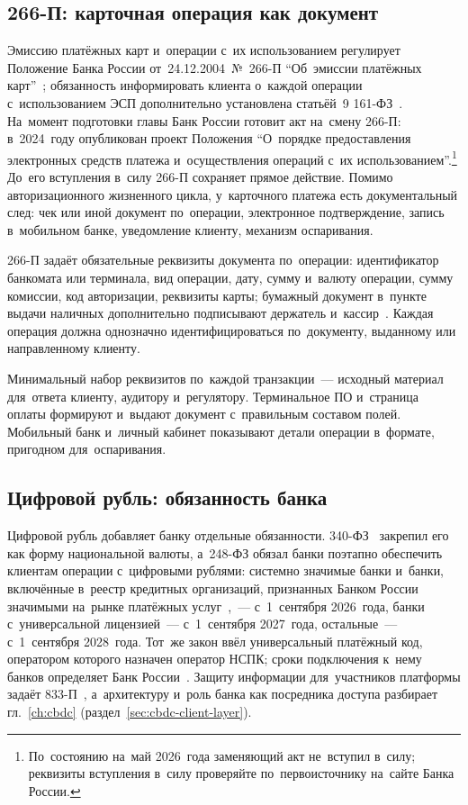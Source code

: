 \subsection*{266-П: карточная операция как документ}

Эмиссию платёжных карт и~операции с~их использованием регулирует Положение
Банка России от~24.12.2004~№~266-П \enquote{Об~эмиссии платёжных
карт}~\cite{cbr-266p}; обязанность информировать клиента о~каждой операции
с~использованием ЭСП дополнительно установлена статьёй~9 161-ФЗ~\cite{fz-161}.
На~момент подготовки главы Банк России готовит акт на~смену 266-П: в~2024~году
опубликован проект Положения \enquote{О~порядке предоставления электронных
  средств платежа и~осуществления операций с~их
использованием}.\footnote{По~состоянию на~май 2026~года заменяющий акт
  не~вступил в~силу; реквизиты вступления в~силу проверяйте по~первоисточнику
на~сайте Банка России.} До~его вступления в~силу 266-П сохраняет прямое
действие. Помимо авторизационного жизненного цикла, у~карточного платежа есть
документальный след: чек или иной документ по~операции,
электронное подтверждение, запись в~мобильном банке, уведомление клиенту,
механизм оспаривания.

266-П задаёт обязательные реквизиты документа по~операции: идентификатор
банкомата или терминала, вид операции, дату, сумму и~валюту операции, сумму
комиссии, код авторизации, реквизиты карты; бумажный документ в~пункте выдачи
наличных дополнительно подписывают держатель и~кассир~\cite{cbr-266p}. Каждая операция должна
однозначно идентифицироваться по~документу, выданному или направленному
клиенту.

Минимальный набор реквизитов по~каждой транзакции~--- исходный материал
для~ответа клиенту, аудитору и~регулятору. Терминальное ПО и~страница оплаты
формируют и~выдают документ с~правильным составом полей. Мобильный банк
и~личный кабинет показывают детали операции в~формате, пригодном
для~оспаривания.

\subsection*{Цифровой рубль: обязанность банка}

Цифровой рубль добавляет банку отдельные обязанности. 340-ФЗ~\cite{fz-340}
закрепил его как форму национальной валюты, а~248-ФЗ обязал банки поэтапно
обеспечить клиентам операции с~цифровыми рублями: системно значимые банки
и~банки, включённые в~реестр кредитных организаций, признанных Банком России
значимыми на~рынке платёжных
услуг~\cite{cbr-significant-payment-services-register},~--- с~1~сентября
2026~года, банки с~универсальной лицензией~--- с~1~сентября 2027~года,
остальные~--- с~1~сентября 2028~года. Тот~же закон ввёл универсальный
платёжный код, оператором которого назначен оператор НСПК; сроки подключения
к~нему банков определяет Банк России~\cite{fz-248}.
Защиту информации
для~участников платформы задаёт 833-П~\cite{cbr-833p}, а~архитектуру и~роль
банка как посредника доступа разбирает гл.~\ref{ch:cbdc}
(раздел~\ref{sec:cbdc-client-layer}).

